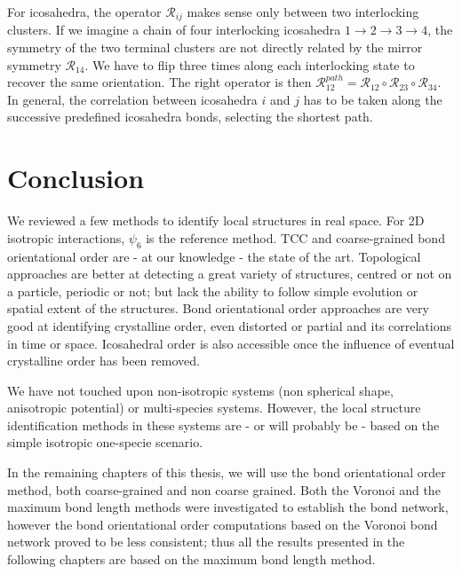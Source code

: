 For icosahedra, the operator $\mathcal{R}_{i j}$ makes sense only between two interlocking clusters. If we imagine a chain of four interlocking icosahedra $1\rightarrow2\rightarrow3\rightarrow4$, the symmetry of the two terminal clusters are not directly related by the mirror symmetry $\mathcal{R}_{1 4}$. We have to flip three times along each interlocking state to recover the same orientation. The right operator is then $\mathcal{R}_{1 2}^{path} = \mathcal{R}_{1 2} \circ \mathcal{R}_{2 3} \circ \mathcal{R}_{3 4}$. In general, the correlation between icosahedra $i$ and $j$ has to be taken along the successive predefined icosahedra bonds, selecting the shortest path.


\section{Conclusion}

We reviewed a few methods to identify local structures in real space. For 2D isotropic interactions, $\psi_6$ is the reference method. TCC and coarse-grained bond orientational order are - at our knowledge - the state of the art. Topological approaches are better at detecting a great variety of structures, centred or not on a particle, periodic or not; but lack the ability to follow simple evolution or spatial extent of the structures. Bond orientational order approaches are very good at identifying crystalline order, even distorted or partial and its correlations in time or space. Icosahedral order is also accessible once the influence of eventual crystalline order has been removed.

We have not touched upon non-isotropic systems (non spherical shape, anisotropic potential) or multi-species systems. However, the local structure identification methods in these systems are - or will probably be - based on the simple isotropic one-specie scenario.

In the remaining chapters of this thesis, we will use the bond orientational order method, both coarse-grained and non coarse grained. Both the Voronoi and the maximum bond length methods were investigated to establish the bond network, however the bond orientational order computations based on the Voronoi bond network proved to be less consistent; thus all the results presented in the following chapters are based on the maximum bond length method.

%
%

